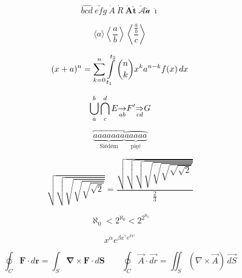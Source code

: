 \pagestyle{empty}

\begin{displaymath}
  \widehat{bcd} \ \widetilde{efg} \ \dot A \ \dot R  \ \symbf{\dot A \check t} 
  \  \check{\mathcal{A}} \check{\mathcal{a}} \ \symbf{\acute \imath}
\end{displaymath}

\begin{displaymath}
  \langle a \rangle \left\langle \frac{a}{b} \right\rangle
  \left\langle \frac{\frac{a}{b}}{c} \right\rangle
\end{displaymath}

\begin{displaymath}
  (x + a)^n = \sum_{k=0}^n \intop_{t_1}^{t_2} {n \choose k} x^k a^{n-k}f(x)\,dx
\end{displaymath}

\begin{displaymath}
 \def\buildrel#1\below#2{\mathrel{\mathop{\kern0mm#2}\limits_{#1}}}
 \bigcup_a^b \bigcap_c^d E {\buildrel ab \below \rightarrow} F' {\buildrel cd \below \Rightarrow} G
\end{displaymath}

\begin{displaymath}
 \underbrace{\overbracket{aaaaaaa}}_\textrm{Siédém}
 \underbrace{\overparen{aaaaa}}_\textrm{pięć}
\end{displaymath}

\begin{displaymath}
 \sqrt{\sqrt{\sqrt{\sqrt{\sqrt{\sqrt{2}}}}}} =
 \frac{\sqrt{\sqrt{\sqrt{\sqrt{\sqrt{\sqrt{\sqrt{\sqrt{2}}}}}}}}}{\frac{2}{3}}
\end{displaymath}

\begin{displaymath}
 \aleph_{0}<2^{\aleph_0}<2^{2^{\aleph_0}}
\end{displaymath}

\begin{displaymath}
x^{\alpha} e^{\beta x^{\gamma} e^{\delta x^{\epsilon}}}
\end{displaymath}

\begin{displaymath}
 \oint_C\symbf{F}\cdot d\symbf{r}=\int_S\symbf{\nabla}\times\symbf{F}\cdot d\symbf{S}\qquad
 \oint_C\vec{A}\cdot\vec{dr}=\iint_S(\nabla\times\vec{A})\,\vec{dS}
\end{displaymath}

